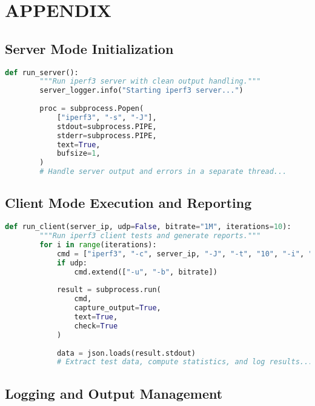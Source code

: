 
\section{APPENDIX} \label{sec:appendix}

\subsection*{Server Mode Initialization}

\begin{lstlisting}[language=Python, caption={Excerpt for server mode initialization.}]
    def run_server():
        """Run iperf3 server with clean output handling."""
        server_logger.info("Starting iperf3 server...")
        
        proc = subprocess.Popen(
            ["iperf3", "-s", "-J"],
            stdout=subprocess.PIPE,
            stderr=subprocess.PIPE,
            text=True,
            bufsize=1,
        )
        # Handle server output and errors in a separate thread...
\end{lstlisting}

\subsection*{Client Mode Execution and Reporting}

\begin{lstlisting}[language=Python, caption={Excerpt for client mode execution.}]
    def run_client(server_ip, udp=False, bitrate="1M", iterations=10):
        """Run iperf3 client tests and generate reports."""
        for i in range(iterations):
            cmd = ["iperf3", "-c", server_ip, "-J", "-t", "10", "-i", "1"]
            if udp:
                cmd.extend(["-u", "-b", bitrate])
            
            result = subprocess.run(
                cmd,
                capture_output=True,
                text=True,
                check=True
            )
            
            data = json.loads(result.stdout)
            # Extract test data, compute statistics, and log results...
\end{lstlisting}

\subsection*{Logging and Output Management}

